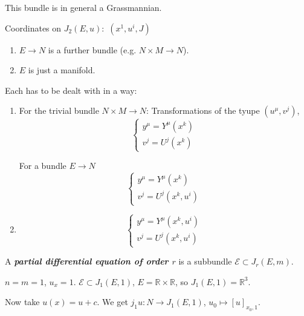 \begin{remark}\leavevmode
	This bundle is in general a Grassmannian.
\end{remark}

Coordinates on $J_2(E,u):$ $(x^1,u^i,J)$
\begin{enumerate}
\item $E \to N$ is a further bundle (e.g.  $N\times M \to N$).
\item $E$ is just a  manifold.
\end{enumerate}

Each has to be dealt with in a way:
\begin{enumerate}
\item For the trivial bundle $N\times M \to N$: Transformations of the tyupe $(u^\mu,v^j)$,
	\[\begin{cases}
		y^\mu=Y^\mu(x^k) \\
		v^j=U^j(x^k)
	\end{cases}\]

For a bundle $E \to N$ 
\[\begin{cases}
		y^\mu=Y^\mu(x^k) \\
		v^j=U^j(x^k, u^i)
	\end{cases}\]

\item 
	\[\begin{cases}
		y^\mu=Y^\mu(x^k,u^i) \\
		v^j=U^j(x^k,u^i)
	\end{cases}\]
\end{enumerate}

\begin{defn}\leavevmode
	A \textit{\textbf{partial differential equation of order $r$}} is a subbundle $\mathcal{E}\subset J_r(E,m)$.
\end{defn}

\begin{example}\leavevmode
$n=m=1$, $u_x=1$. $\mathcal{E}\subset J_1(E,1)$, $E= \mathbb{R} \times \mathbb{R}$, so $J_1(E,1)=\mathbb{R}^3$.

Now take $u(x)=u+c$. We get  $j_1u:N \to J_1(E,1)$, $ u_0 \mapsto [u]_{x_0,1}$.
\end{example}

